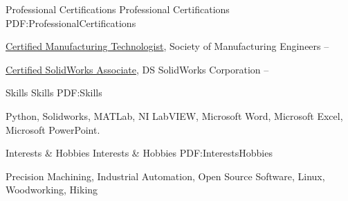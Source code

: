 \documentclass[letterpaper,MMMyyyy,nonstopmode]{resume}
\begin{document}
\begin{Body}
\Section
{Professional Certifications}
{Professional Certifications}
{PDF:ProfessionalCertifications}

\BulletItem
\href{http://www.sme.org/cmfgt/}
{Certified Manufacturing Technologist},
Society of Manufacturing Engineers
\hfill
{} --

\BulletItem
\href{http://www.solidworks.com/sw/support/mcad-certification-programs.htm}
{Certified SolidWorks Associate},
DS SolidWorks Corporation
\hfill
{} --



\Section
{Skills}
{Skills}
{PDF:Skills}

\Entry
Python, Solidworks, MATLab, NI LabVIEW,
Microsoft Word, Microsoft Excel, Microsoft PowerPoint.



\Section
{Interests \& Hobbies}
{Interests \& Hobbies}
{PDF:InterestsHobbies}

\Entry
Precision Machining,
Industrial Automation,
Open Source Software,
Linux, Woodworking, Hiking

\end{Body}
\end{document}
